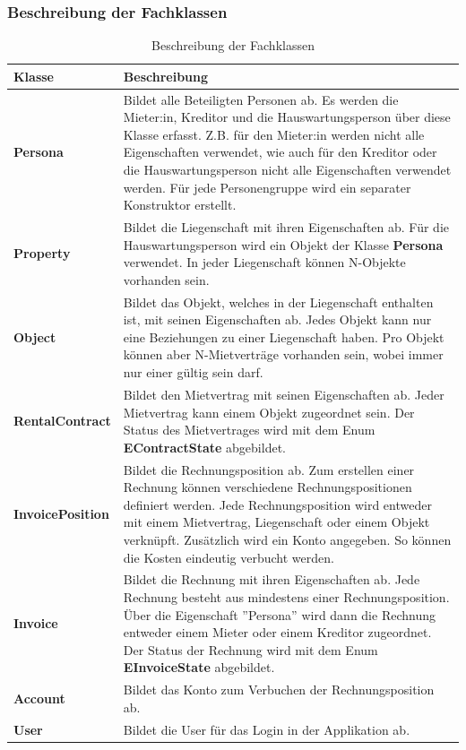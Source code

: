 \subsubsection{Beschreibung der Fachklassen}
\begin{table}[H]
  \centering
  \settowidth{}
  \setlength\extrarowheight{2pt}
    \begin{tabulary}{1.0\textwidth}{|L|L|}
      \hline
      \textbf{Klasse}& \textbf{Beschreibung}\\
    \hline
    \textbf{Persona} & Bildet alle Beteiligten Personen ab. Es werden die Mieter:in, Kreditor und die Hauswartungsperson über diese Klasse erfasst. Z.B. für den Mieter:in werden nicht alle Eigenschaften verwendet, wie auch für den Kreditor oder die Hauswartungsperson nicht alle Eigenschaften verwendet werden. Für jede Personengruppe wird ein separater Konstruktor erstellt.\\
    \hline
    \textbf{Property} & Bildet die Liegenschaft mit ihren Eigenschaften ab. Für die Hauswartungsperson wird ein Objekt der Klasse \textbf{Persona} verwendet. In jeder Liegenschaft können N-Objekte vorhanden sein.\\
    \hline
    \textbf{Object} & Bildet das Objekt, welches in der Liegenschaft enthalten ist, mit seinen Eigenschaften ab. Jedes Objekt kann nur eine Beziehungen zu einer Liegenschaft haben. Pro Objekt können aber N-Mietverträge vorhanden sein, wobei immer nur einer gültig sein darf. \\
    \hline
    \textbf{RentalContract} & Bildet den Mietvertrag mit seinen Eigenschaften ab. Jeder Mietvertrag kann einem Objekt zugeordnet sein. Der Status des Mietvertrages wird mit dem Enum \textbf{EContractState} abgebildet.\\
    \hline
    \textbf{InvoicePosition} & Bildet die Rechnungsposition ab. Zum erstellen einer Rechnung können verschiedene Rechnungspositionen definiert werden. Jede Rechnungsposition wird entweder mit einem Mietvertrag, Liegenschaft oder einem Objekt verknüpft. Zusätzlich wird ein Konto angegeben. So können die Kosten eindeutig verbucht werden.\\
    \hline
    \textbf{Invoice} & Bildet die Rechnung mit ihren Eigenschaften ab. Jede Rechnung besteht aus mindestens einer Rechnungsposition. Über die Eigenschaft ''Persona'' wird dann die Rechnung entweder einem Mieter oder einem Kreditor zugeordnet. Der Status der Rechnung wird mit dem Enum \textbf{EInvoiceState} abgebildet.\\
    \hline
    \textbf{Account} & Bildet das Konto zum Verbuchen der Rechnungsposition ab.\\
    \hline 
    \textbf{User} & Bildet die User für das Login in der Applikation ab.\\
    \hline
\end{tabulary}
\caption{Beschreibung der Fachklassen}
\end{table}

